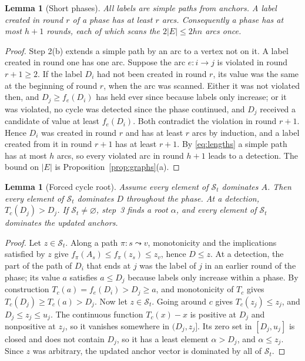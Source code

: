 \documentclass[11pt,a4paper]{article}
\theoremstyle{plain}
\newtheorem{lemma}[theorem]{Lemma}
\theoremstyle{definition}
\theoremstyle{remark}
\newcommand{\St}{\mathcal{S}_t}
\begin{document}
\begin{lemma}[Short phases]\label{lem:rounds}
All labels are simple paths from anchors. A label created in round $r$ of a phase has at least $r$ arcs. Consequently a phase has at most $h+1$ rounds, each of which scans the $2|E|\le2hn$ arcs once.
\end{lemma}
\begin{proof}
Step 2(b) extends a simple path by an arc to a vertex not on it. A label created in round one has one arc. Suppose the arc $e\colon i\to j$ is violated in round $r+1\ge2$. If the label $D_i$ had not been created in round $r$, its value was the same at the beginning of round $r$, when the arc was scanned. Either it was not violated then, and $D_j\ge f_e(D_i)$ has held ever since because labels only increase; or it was violated, no cycle was detected since the phase continued, and $D_j$ received a candidate of value at least $f_e(D_i)$. Both contradict the violation in round $r+1$. Hence $D_i$ was created in round $r$ and has at least $r$ arcs by induction, and a label created from it in round $r+1$ has at least $r+1$. By \eqref{eq:lengths} a simple path has at most $h$ arcs, so every violated arc in round $h+1$ leads to a detection. The bound on $|E|$ is Proposition~\ref{prop:graphs}(a).
\end{proof}

\begin{lemma}[Forced cycle root]\label{lem:jump}
Assume every element of $\St$ dominates $A$. Then every element of $\St$ dominates $D$ throughout the phase. At a detection, $T_c(D_j)>D_j$. If $\St\ne\varnothing$, step~3 finds a root $\alpha$, and every element of $\St$ dominates the updated anchors.
\end{lemma}
\begin{proof}
Let $z\in\St$. Along a path $\pi\colon s\leadsto v$, monotonicity and the implications satisfied by $z$ give $f_\pi(A_s)\le f_\pi(z_s)\le z_v$, hence $D\le z$. At a detection, the part of the path of $D_i$ that ends at $j$ was the label of $j$ in an earlier round of the phase; its value $a$ satisfies $a\le D_j$ because labels only increase within a phase. By construction $T_c(a)=f_e(D_i)>D_j\ge a$, and monotonicity of $T_c$ gives $T_c(D_j)\ge T_c(a)>D_j$. Now let $z\in\St$. Going around $c$ gives $T_c(z_j)\le z_j$, and $D_j\le z_j\le u_j$. The continuous function $T_c(x)-x$ is positive at $D_j$ and nonpositive at $z_j$, so it vanishes somewhere in $(D_j,z_j]$. Its zero set in $[D_j,u_j]$ is closed and does not contain $D_j$, so it has a least element $\alpha>D_j$, and $\alpha\le z_j$. Since $z$ was arbitrary, the updated anchor vector is dominated by all of $\St$.
\end{proof}
\end{document}
